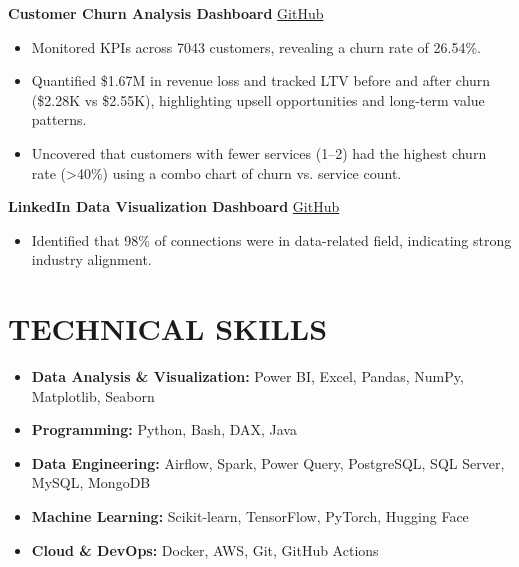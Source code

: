 \documentclass[11pt]{article}
\begin{document}
\textbf{Customer Churn Analysis Dashboard} \hfill \href{https://github.com/Mostafa-Elnagar/ChurnAnalysisDashboard}{GitHub}
\begin{itemize}
\item Monitored KPIs across 7043 customers, revealing a churn rate of 26.54\%.
\item Quantified \$1.67M in revenue loss and tracked LTV before and after churn (\$2.28K vs \$2.55K), highlighting upsell opportunities and long-term value patterns.
\item Uncovered that customers with fewer services (1–2) had the highest churn rate (\textgreater40\%) using a combo chart of churn vs. service count.\\
\end{itemize}

\textbf{LinkedIn Data Visualization Dashboard} \hfill \href{https://github.com/Mostafa-Elnagar/linkedin-dashboard}{GitHub}
\begin{itemize}
  \item Identified that 98\% of connections were in data-related field, indicating strong industry alignment.
\end{itemize}

\section{TECHNICAL SKILLS}

\begin{itemize}
\item \textbf{Data Analysis \& Visualization:} Power BI, Excel, Pandas, NumPy, Matplotlib, Seaborn
\item \textbf{Programming:} Python, Bash, DAX, Java
\item \textbf{Data Engineering:} Airflow, Spark, Power Query, PostgreSQL, SQL Server, MySQL, MongoDB
\item \textbf{Machine Learning:} Scikit-learn, TensorFlow, PyTorch, Hugging Face
\item \textbf{Cloud \& DevOps:} Docker, AWS, Git, GitHub Actions
\end{itemize}
\end{document}
